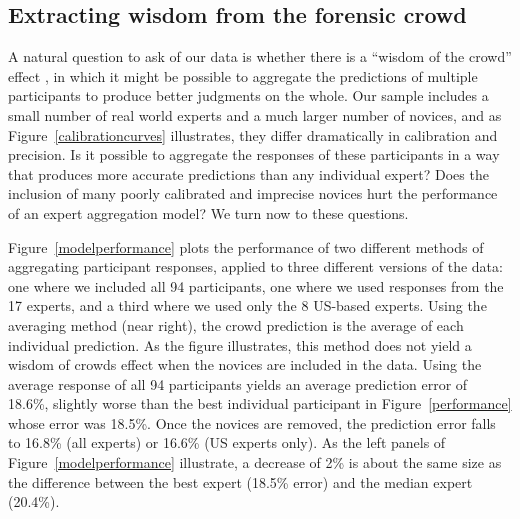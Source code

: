 \documentclass[doc]{apa6} %
\begin{document}
\subsection{Extracting wisdom from the forensic crowd}

A natural question to ask of our data is whether there is a ``wisdom of the crowd'' effect \cite{surowiecki2005wisdom}, in which it might be possible to aggregate the predictions of multiple participants to produce better judgments on the whole. Our sample includes a small number of real world experts and a much larger number of novices, and as Figure~\ref{calibrationcurves} illustrates, they differ dramatically in calibration and precision. Is it possible to aggregate the responses of these participants in a way that produces more accurate predictions than any individual expert? Does the inclusion of many poorly calibrated and imprecise novices hurt the performance of an expert aggregation model? We turn now to these questions.

Figure~\ref{modelperformance} plots the performance of two different methods of aggregating participant responses, applied to three different versions of the data: one where we included all 94 participants, one where we used responses from the 17 experts, and a third where we used only the 8 US-based experts. Using the averaging method (near right), the crowd prediction is the average of each individual prediction. As the figure illustrates, this method does not yield a wisdom of crowds effect when the novices are included in the data. Using the average response of all 94 participants yields an average prediction error of 18.6\%, slightly worse than the best individual participant in Figure~\ref{performance} whose error was 18.5\%. Once the novices are removed, the prediction error falls to 16.8\% (all experts) or 16.6\% (US experts only). As the left panels of Figure~\ref{modelperformance} illustrate, a decrease of 2\% is about the same size as the difference between the best expert (18.5\% error) and the median expert (20.4\%).
\end{document}
